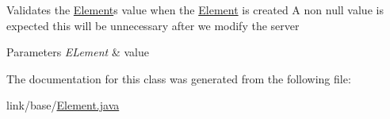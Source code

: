 Validates the \hyperlink{classbridges_1_1base_1_1_element}{Element}\textquotesingle{}s value when the \hyperlink{classbridges_1_1base_1_1_element}{Element} is created A non null value is expected this will be unnecessary after we modify the server 
\begin{DoxyParams}{Parameters}
{\em E\+Lement} & value \\
\hline
\end{DoxyParams}


The documentation for this class was generated from the following file\+:\begin{DoxyCompactItemize}
\item 
link/base/\hyperlink{_element_8java}{Element.\+java}\end{DoxyCompactItemize}
